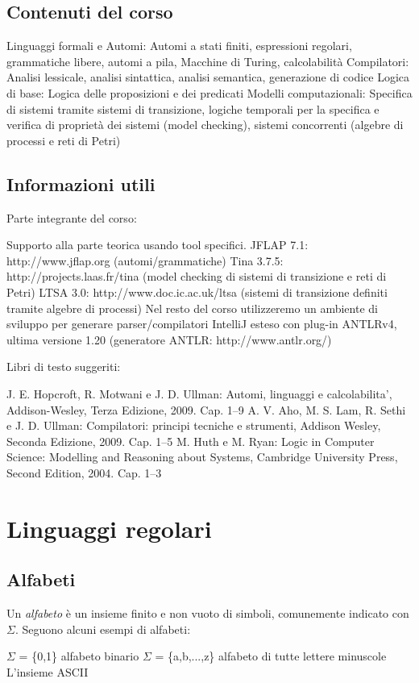 \documentclass[12pt]{article}
\begin{document}
\subsection{Contenuti del corso}
\begin{outline}
	\1 Linguaggi formali e Automi:
	\2 Automi a stati finiti, espressioni regolari, grammatiche libere, automi a pila, Macchine di Turing, calcolabilità
	\1 Compilatori:
	\2 Analisi lessicale, analisi sintattica, analisi semantica, generazione di codice
	\1 Logica di base:
	\2 Logica delle proposizioni e dei predicati
	\1 Modelli computazionali:
	\2 Specifica di sistemi tramite sistemi di transizione, logiche temporali per la specifica e verifica di proprietà dei sistemi (model checking), sistemi concorrenti (algebre di processi e reti di Petri)
\end{outline}

\subsection{Informazioni utili}
Parte integrante del corso:
\begin{outline}
	\1 Supporto alla parte teorica usando tool specifici.
	\2 JFLAP 7.1: http://www.jflap.org (automi/grammatiche)
	\2 Tina 3.7.5: http://projects.laas.fr/tina
	(model checking di sistemi di transizione e reti di Petri)
	\2 LTSA 3.0: http://www.doc.ic.ac.uk/ltsa
	(sistemi di transizione definiti tramite algebre di processi)
	\1 Nel resto del corso utilizzeremo un ambiente di sviluppo per
	generare parser/compilatori
	\2 IntelliJ esteso con plug-in ANTLRv4, ultima versione 1.20
	(generatore ANTLR: http://www.antlr.org/)
\end{outline}

\newpage
Libri di testo suggeriti:
\begin{outline}
	\1 J. E. Hopcroft, R. Motwani e J. D. Ullman:
	Automi, linguaggi e calcolabilita’,
	Addison-Wesley, Terza Edizione, 2009. Cap. 1–9
	\1 A. V. Aho, M. S. Lam, R. Sethi e J. D. Ullman:
	Compilatori: principi tecniche e strumenti,
	Addison Wesley, Seconda Edizione, 2009. Cap. 1–5
	\1 M. Huth e M. Ryan:
	Logic in Computer Science: Modelling and Reasoning about
	Systems,
	Cambridge University Press, Second Edition, 2004. Cap. 1–3
\end{outline}

\section{Linguaggi regolari}
\subsection{Alfabeti}
Un \emph{alfabeto} è un insieme finito e non vuoto di simboli, comunemente indicato con $\Sigma$. Seguono alcuni esempi di alfabeti:
\begin{outline}
	\1 $\Sigma$ = \{0,1\} alfabeto binario
	\1 $\Sigma$ = \{a,b,...,z\} alfabeto di tutte lettere minuscole
	\1 L'insieme ASCII
\end{outline}
\end{document}
